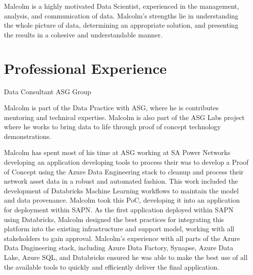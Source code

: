 



\makecvtitle{}
\vspace{-3em}

Malcolm is a highly motivated Data Scientist,
experienced in the management, analysis, and communication of data.
Malcolm’s strengths lie in understanding the whole picture of data,
determining an appropriate solution,
and presenting the results in a cohesive and understandable manner.

\section{Professional Experience}

{Data Consultant}
{ASG Group}{}{}
{%
  Malcolm is part of the Data Practice with ASG, 
  where he is contributes mentoring and technical expertise. 
  Malcolm is also part of the ASG Labs project
  where he works to bring data to life through 
  proof of concept technology demonstrations.

  Malcolm has spent most of his time at ASG working at SA Power Networks 
  developing an application 
  developing tools to process their 
  was to develop a Proof
  of Concept using the Azure Data Engineering stack to cleanup and process
  their network asset data in a robust and automated fashion. This work
  included the development of Databricks Machine Learning workflows to maintain
  the model and data provenance.
  Malcolm took this PoC, developing it into an application for deployment within
  SAPN. 
  As the first application deployed within SAPN using Databricks, Malcolm
  designed the best practices for integrating this platform into the existing
  infrastructure and support model, working with all stakeholders to gain
  approval. Malcolm’s experience with all parts of the Azure Data Dngineering
  stack, including Azure Data Factory, Synapse, Azure Data Lake, Azure SQL, and
  Databricks ensured he was able to make the best use of all the available tools
  to quickly and efficiently deliver the final application.
}

